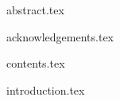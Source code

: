 \documentclass{bris}
\begin{document}

\maketitle

\frontmatter

\makedecl

{abstract.tex}

{acknowledgements.tex}

{contents.tex}
\cleardoublepage

\mainmatter

{introduction.tex}
\end{document}
